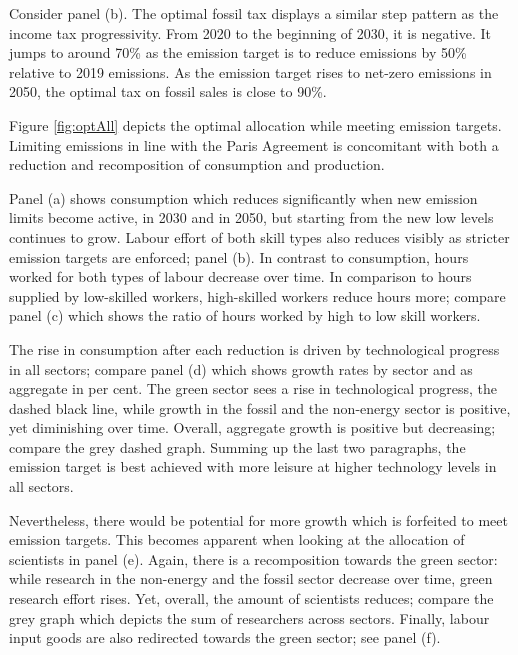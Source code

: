 Consider panel (b). The optimal fossil tax displays a similar step pattern as the income tax progressivity. From 2020 to the beginning of 2030, it is negative. It jumps to around 70\% as the emission target is to reduce emissions by 50\% relative to 2019 emissions. As the emission target rises  to net-zero emissions in 2050, the optimal tax on fossil sales is close to 90\%. 

Figure \ref{fig:optAll} depicts the optimal allocation while meeting emission targets. Limiting emissions in line with the Paris Agreement is concomitant with both a reduction and recomposition of consumption and production. 

Panel (a) shows consumption which reduces significantly when new emission limits become active, in 2030 and in 2050, but starting from the new low levels continues to grow. Labour effort of both skill types also reduces visibly as stricter emission targets are enforced; panel (b). In contrast to consumption, hours worked for both types of labour decrease over time. In comparison to hours supplied by low-skilled workers, high-skilled workers reduce hours more; compare panel (c) which shows the ratio of hours worked by high to low skill workers. 

The rise in consumption after each reduction is driven by technological progress in all sectors; compare panel (d) which shows growth rates by sector and as aggregate in per cent. 
The green sector sees a rise in technological progress, the dashed black line, while growth in the fossil and the non-energy sector is positive, yet diminishing over time. Overall, aggregate growth is positive but decreasing; compare the grey dashed graph. 
Summing up the last two paragraphs, the emission target is best achieved with more leisure at higher technology levels in all sectors. 

Nevertheless, there would be potential for more growth which is forfeited to meet emission targets. This becomes apparent when looking at the allocation of scientists in panel (e). Again, there is a recomposition towards the green sector: while research in the non-energy and the fossil sector decrease over time, green research effort rises. Yet, overall, the amount of scientists reduces; compare the grey graph which depicts the sum of researchers across sectors. 
Finally, labour input goods are also redirected towards the green sector; see panel (f). 

